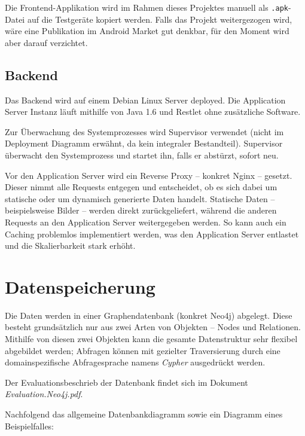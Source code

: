 \documentclass[10pt,a4paper]{scrartcl}
\begin{document}
Die Frontend-Applikation wird im Rahmen dieses Projektes manuell als \texttt{.apk}-Datei auf die
Testgeräte kopiert werden. Falls das Projekt weitergezogen wird, wäre eine Publikation im Android
Market gut denkbar, für den Moment wird aber darauf verzichtet.


\subsection{Backend}

Das Backend wird auf einem Debian Linux Server deployed. Die Application Server Instanz läuft
mithilfe von Java 1.6 und Restlet ohne zusätzliche Software.

Zur Überwachung des Systemprozesses
wird Supervisor verwendet (nicht im Deployment Diagramm erwähnt, da kein integraler Bestandteil).
Supervisor überwacht den Systemprozess und startet ihn, falls er abstürzt, sofort neu. 

Vor den Application Server wird ein Reverse Proxy -- konkret Nginx -- gesetzt. Dieser nimmt alle
Requests entgegen und entscheidet, ob es sich dabei um statische oder um dynamisch generierte Daten
handelt. Statische Daten -- beispielsweise Bilder -- werden direkt zurückgeliefert, während
die anderen Requests an den Application Server weitergegeben werden. So kann auch ein Caching
problemlos implementiert werden, was den Application Server entlastet und die Skalierbarkeit stark
erhöht.


\section{Datenspeicherung}

Die Daten werden in einer Graphendatenbank (konkret Neo4j) abgelegt. Diese besteht grundsätzlich nur
aus zwei Arten von Objekten -- Nodes und Relationen. Mithilfe von diesen zwei Objekten kann die
gesamte Datenstruktur sehr flexibel abgebildet werden; Abfragen können mit gezielter Traversierung
durch eine domainspezifische Abfragesprache namens \textit{Cypher} ausgedrückt werden.

Der Evaluationsbeschrieb der Datenbank findet sich im Dokument \textit{Evaluation.Neo4j.pdf}.

Nachfolgend das allgemeine Datenbankdiagramm sowie ein Diagramm eines Beispielfalles:
\end{document}
